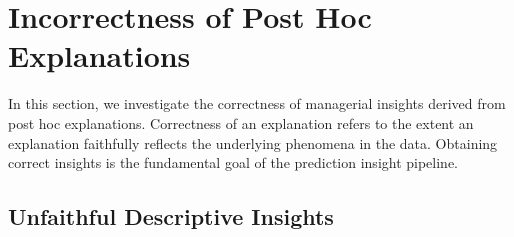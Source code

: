 \documentclass[11pt]{article}    %
\def\pipeline{prediction insight pipeline}
\begin{document}




\section{Incorrectness of Post Hoc Explanations}
    In this section, we investigate the correctness of managerial insights derived from post hoc explanations. Correctness of an explanation refers to the extent an explanation faithfully reflects the underlying phenomena in the data. Obtaining correct insights is the fundamental goal of the \pipeline. %


            \subsection{Unfaithful Descriptive Insights}
                    \label{sec:unfaithful_descriptive}
                    
\end{document}

